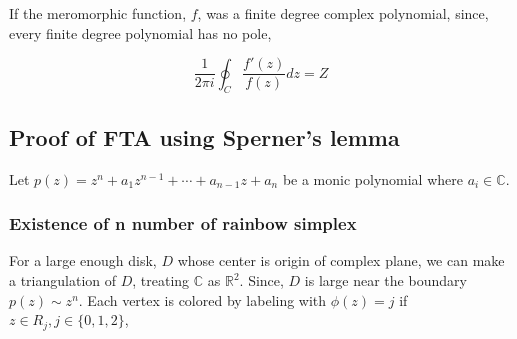 \documentclass[a4paper,12pt]{article}
\begin{document}
If the meromorphic function, $f$, was a finite degree complex polynomial, 
since, every finite degree polynomial has no pole,

\begin{equation}
    \frac{1}{2 \pi i} \oint_{C} \frac{f'(z)}{f(z)} dz=  Z 
\end{equation}


\subsection{Proof of FTA using Sperner's lemma}

Let $p(z) = z^n + a_1 z^{n-1} + \cdots + a_{n-1} z + a_n$ be a monic polynomial
where $a_i \in \mathbb{C}$.

\subsubsection{Existence of n number of rainbow simplex}
For a large enough disk, $D$ whose center is origin of complex plane,
we can make a triangulation of $D$, treating $\mathbb{C}$ as $\mathbb{R}^2$.
Since, $D$ is large near the boundary $p(z) \sim z^n$.
Each vertex is colored by labeling with $\phi(z) = j$ if $z \in R_j, j \in \{0, 1, 2\}$,
\end{document}
